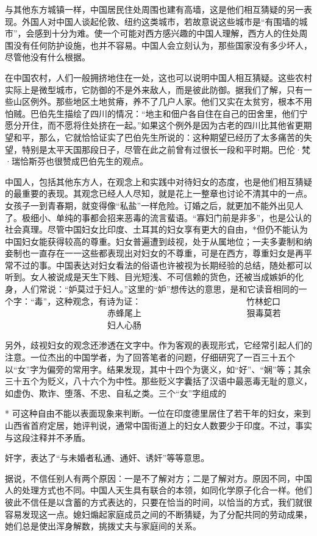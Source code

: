 \documentclass[12pt,oneside]{book}
\begin{document}
\begin{common-format}
与其他东方城镇一样，中国居民住处周围也建有高墙，这是他们相互猜疑的另一表现。外国人对中国人谈起伦敦、纽约这类城市，若故意说这些城市是“有围墙的城市”，会感到十分为难。使一个可能对西方感兴趣的中国人理解，西方人的住处周围没有任何防护设施，也并不容易。中国人会立刻认为，那些国家没有多少坏人，尽管他没有什么根据。 

在中国农村，人们一般拥挤地住在一处，这也可以说明中国人相互猜疑。这些农村实际上是微型城市，它防御的不是外来敌人，而是彼此防御。据我们了解，只有一些山区例外。那些地区土地贫瘠，养不了几户人家。他们又实在太贫穷，根本不用怕贼。巴伯先生描绘了四川的情况：“地主和佃户各自住在自己的田舍里，他们宁愿分开住，而不愿将住处挤在一起。”如果这个例外是因为古老的四川比其他省更期望和平，那么，它就恰恰证实了巴伯先生所说的：这种期望已经历了太多痛苦的失望，特别是太平天国那段日子，尽管在此之前曾有过很长一段和平时期。巴伦·梵·瑞恰斯芬也很赞成巴伯先生的观点。 

中国人，包括其他东方人，在观念上和实践中对待妇女的态度，也是他们相互猜疑的最重要的表现。其观念已经人人尽知，就是花上一整章也讨论不清其中的一点。女孩子一到青春期，就变得像“私盐”一样危险。订婚之后，就更加不能外出见人了。极细小、单纯的事都会招来恶毒的流言蜚语。“寡妇门前是非多”，也是公认的社会真理。尽管中国妇女比印度、土耳其的妇女享有更大的自由，*但仍不能认为中国妇女能获得较高的尊重。妇女普遍遭到歧视，处于从属地位；一夫多妻制和纳妾制也一直存在一一这些都表现出对妇女的不尊重，可是在西方，尊重妇女是再平常不过的事。中国表达对妇女看法的俗语也许被视为长期经验的总结，随处都可以听到。女人被说成是天生下贱、目光短浅、不可信赖的货色，还被当成嫉妒的化身，人们常说：“妒莫过于妇人。”这里的“妒”想传达的意思，是和它读音相同的一个字：“毒”，这种观念，有诗为证： 
　　　　　　　　　　　　竹林蛇口 
　　　　　　　　　　　　赤蜂尾上 
　　　　　　　　　　　　狠毒莫若 
　　　　　　　　　　　　妇人心肠 

另外，歧视妇女的观念还渗透在文字中。作为客观的表现形式，它经常引起人们的注意。一位杰出的中国学者，为了回答笔者的问题，仔细研究了一百三十五个以“女”字为偏旁的常用字。结果发现，其中十四个为褒义，如“好”、“娴”等；其余三十五个为贬义，八十六个为中性。那些贬义字囊括了汉语中最恶毒无耻的意义，如虚伪、欺诈、堕落、不忠、自私之类。三个“女”字组成的 

* 可这种自由不能以表面现象来判断。一位在印度德里居住了若干年的妇女，来到山西省首府定居，她评判说，通常中国街道上的妇女人数要少于印度。不过，事实与这段注释并不矛盾。 

奸字，表达了“与未婚者私通、通奸、诱奸”等等意思。 

据说，不信任别人有两个原因：一是不了解对方；二是了解对方。原因不同，中国人的处理方式也不同。中国人天生具有联合的本领，如同化学原子化合一样。他们彼此不信任是以含蓄的方式表达的，只要在恰当的时间，以恰当的方式，我们就很容易发现这一点。媳妇煽起家庭成员之间的不断猜疑，为了分配共同的劳动成果，她们总是使出浑身解数，挑拨丈夫与家庭间的关系。 


\end{common-format}
\end{document}
